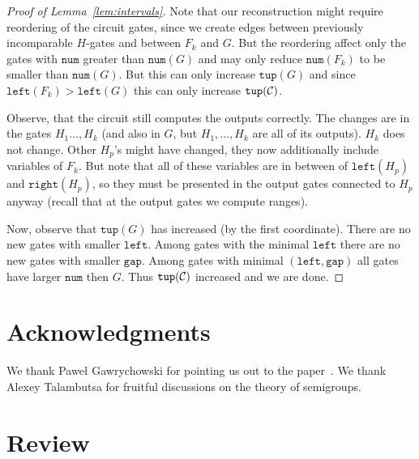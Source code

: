 \documentclass[11pt,letterpaper]{article}
\newcommand{\lef}{\texttt{left}}
\newcommand{\righ}{\texttt{right}}
\newcommand{\gap}{\texttt{gap}}
\newcommand{\num}{\texttt{num}}
\newcommand{\tup}{\texttt{tup}}
\begin{document}
\begin{proof}[Proof of Lemma~\ref{lem:intervals}]
Note that our reconstruction might require reordering of the circuit gates, since we create edges between previously incomparable $H$-gates and between $F_k$ and $G$. But the reordering affect only the gates with $\num$ greater than $\num(G)$ and may only reduce $\num(F_k)$ to be smaller than $\num(G)$. But this can only increase $\tup(G)$ and since $\lef(F_k)>\lef(G)$ this can only increase $\tup({\cal C})$.

Observe, that the circuit still computes the outputs correctly. The changes are in the gates $H_1\ldots, H_k$ (and also in $G$, but $H_1,\ldots, H_k$ are all of its outputs). $H_k$ does not change. Other $H_p$'s might have changed, they now additionally include variables of $F_k$. But note that all of these variables are in between of $\lef(H_p)$ and $\righ(H_p)$, so they must be presented in the output gates connected to $H_p$ anyway (recall that at the output gates we compute ranges).

Now, observe that $\tup(G)$ has increased (by the first coordinate). There are no new gates with smaller $\lef$. Among gates with the minimal $\lef$ there are no new gates with smaller $\gap$. Among gates with minimal $(\lef,\gap)$ all gates have larger $\num$ then $G$. Thus $\tup({\cal C})$ increased and we are done.
\end{proof}


\section*{Acknowledgments}
We thank Paweł Gawrychowski for pointing us out to the paper~\cite{DBLP:journals/ijcga/ChazelleR91}. We thank Alexey Talambutsa for fruitful discussions on the theory of semigroups.




\clearpage
\appendix
\section{Review}




\end{document}
